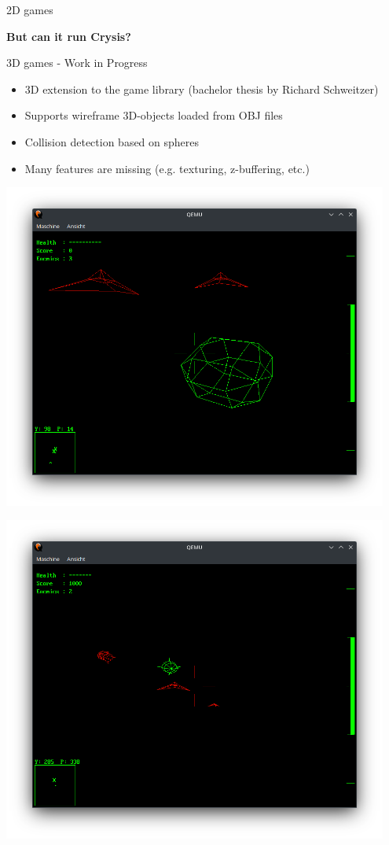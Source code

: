 \begin{frame}{2D games}
\begin{minipage}{0.49\textwidth}
	\end{minipage}
	\pause
	\begin{center}
		\textbf{But can it run Crysis?}
	\end{center}
\end{frame}

\begin{frame}{3D games - Work in Progress}
	\begin{itemize}
		\item 3D extension to the game library (bachelor thesis by Richard Schweitzer)
		\item Supports wireframe 3D-objects loaded from OBJ files
		\item Collision detection based on spheres
		\item Many features are missing (e.g. texturing, z-buffering, etc.)
	\end{itemize}
	\begin{minipage}{0.49\textwidth}
		\includegraphics[width=0.95\textwidth]{img/battlezone1}
	\end{minipage}
	\begin{minipage}{0.49\textwidth}
		\includegraphics[width=0.95\textwidth]{img/battlezone2}
	\end{minipage}
\end{frame}
